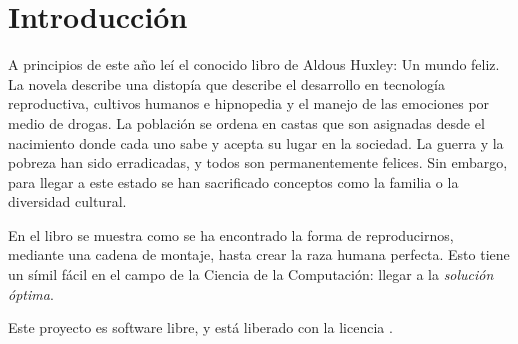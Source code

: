 \chapter{Introducción}

A principios de este año leí el conocido libro de Aldous Huxley: Un mundo feliz. La novela describe una
distopía que describe el desarrollo en tecnología reproductiva, cultivos humanos  e hipnopedia y el manejo de las
emociones por medio de drogas. La población se ordena en castas que son asignadas desde el nacimiento donde cada uno
sabe y acepta su lugar en la sociedad. La guerra y la pobreza han sido erradicadas, y todos son permanentemente
felices. Sin embargo, para llegar a este estado se han sacrificado conceptos como la familia o la diversidad
cultural.

En el libro se muestra como se ha encontrado la forma de reproducirnos, mediante una cadena de montaje,
hasta crear la raza humana perfecta. Esto tiene un símil fácil en el campo de la Ciencia de la Computación: llegar
a la \textit{solución óptima}.

Este proyecto es software libre, y está liberado con la licencia \cite{gplv3}.
